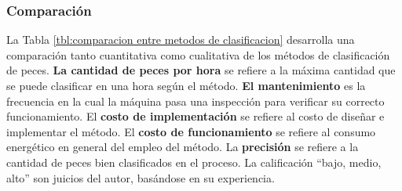 \subsubsection{Comparación}

La Tabla \ref{tbl:comparacion entre metodos de clasificacion} desarrolla una comparación tanto cuantitativa como cualitativa de los métodos de clasificación de peces. \textbf{La cantidad de peces por hora} se refiere a la máxima cantidad que se puede clasificar en una hora según el método. \textbf{El mantenimiento} es la frecuencia en la cual la máquina pasa una inspección para verificar su correcto funcionamiento. El \textbf{costo de implementación} se refiere al costo de diseñar e implementar el método. El \textbf{costo de funcionamiento} se refiere al consumo energético en general del empleo del método. La \textbf{precisión} se refiere a la cantidad de peces bien clasificados en el proceso. La calificación “bajo, medio, alto” son juicios del autor, basándose en su experiencia.

